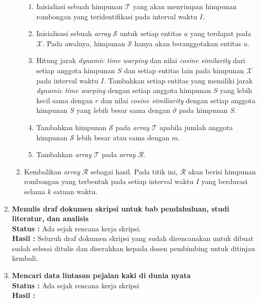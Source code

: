 \documentclass[a4paper,twoside]{article}
\begin{document}
\begin{enumerate}
\begin{enumerate}
            \begin{enumerate}
                \item Inisialiasi sebuah himpunan $\mathcal{T}$ yang akan menyimpan himpunan rombongan yang teridentifikasi pada interval waktu $I$.  
                \item Inisialisasi sebuah \textit{array} $\mathcal{S}$ untuk setiap entitas $a$ yang terdapat pada $\mathcal{X}$. Pada awalnya, himpunan $\mathcal{S}$ hanya akan beranggotakan entitas $a$.
                \item Hitung jarak \textit{dynamic time warping} dan nilai \textit{cosine similarity} dari setiap anggota himpunan $S$ dan setiap entitas lain pada himpunan $\mathcal{X}$ pada interval waktu $I$. Tambahkan setiap entitas yang memiliki jarak \textit{dynamic time warping} dengan setiap anggota himpunan $S$ yang lebih kecil sama dengan $r$ dan nilai \textit{cosine similiarity} dengan setiap anggota himpunan $S$ yang lebih besar sama dengan $\vartheta$ pada himpunan $S$.
                \item Tambahkan himpunan $\mathcal{S}$ pada \textit{array} $\mathcal{T}$ apabila jumlah anggota himpunan $\mathcal{S}$ lebih besar atau sama dengan $m$.
                \item Tambahkan \textit{array} $\mathcal{T}$ pada \textit{array} $\mathcal{R}$.
            \end{enumerate}
            \item Kembalikan \textit{array} $\mathcal{R}$ sebagai hasil. Pada titik ini, $\mathcal{R}$ akan berisi himpunan rombongan yang terbentuk pada setiap interval waktu $I$ yang berdurasi selama $k$ satuan waktu.
        \end{enumerate}

		\item \textbf{Menulis draf dokumen skripsi untuk bab pendahuluan, studi literatur, dan analisis}\\
		{\bf Status :} Ada sejak rencana kerja skripsi.\\
		{\bf Hasil :} Seluruh draf dokumen skripsi yang sudah direncanakan untuk dibuat sudah selesai ditulis dan diserahkan kepada dosen pembimbing untuk ditinjau kembali.

		\item \textbf{Mencari data lintasan pejalan kaki di dunia nyata}\\
		{\bf Status :} Ada sejak rencana kerja skripsi \\
		{\bf Hasil :} 


\end{enumerate}
\end{document}
